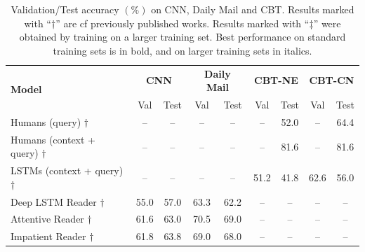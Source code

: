 \documentclass[11pt,a4paper]{article}
\begin{document}
\begin{table}[ht]
\caption{\small Validation/Test accuracy $(\%)$ on CNN, Daily Mail and CBT.
Results marked with ``$\dagger$'' are cf previously published works.
Results marked with ``$\ddagger$'' were obtained by training on a larger training set. Best performance on standard training sets is in bold, and on larger training sets in italics.}
\label{tab:results}
\centering
\begin{tabular}{@{}l|cc|cc|cc|cc@{}}
\toprule
\multirow{2}{*}{\textbf{Model}}       & \multicolumn{2}{c|}{\textbf{CNN}}                     & \multicolumn{2}{c|}{\textbf{Daily Mail}}              & \multicolumn{2}{c|}{\textbf{CBT-NE}}           & \multicolumn{2}{c}{\textbf{CBT-CN}}          \\ \cmidrule(l){2-9} 
                                      & Val                      & Test                      & Val                      & Test                      & Val                   & Test                   & Val                   & Test                  \\ \midrule
Humans (query) $\dagger$                        & --                        & --                         & --                        & --                         & --                     & 52.0                   & --                     & 64.4                  \\
Humans (context + query) $\dagger$              & --                        & --                         & --                        & --                         & --                     & 81.6                   & --                     & 81.6                  \\ \midrule
LSTMs (context + query) $\dagger$               & --                        & --                         & --                        & --                         & 51.2                  & 41.8                   & 62.6                  & 56.0                  \\ 
Deep LSTM Reader $\dagger$ & 55.0 & 57.0 & 63.3 & 62.2 & -- & -- & -- & -- \\
Attentive Reader $\dagger$                      & 61.6                     & 63.0                      & 70.5                     & 69.0                      & --                     & --                      & --                     & --                     \\
Impatient Reader $\dagger$                      & 61.8                     & 63.8                      & 69.0                     & 68.0                      & --                     & --                      & --                     & --                     \\ 

\end{tabular}
\end{table}
\end{document}
